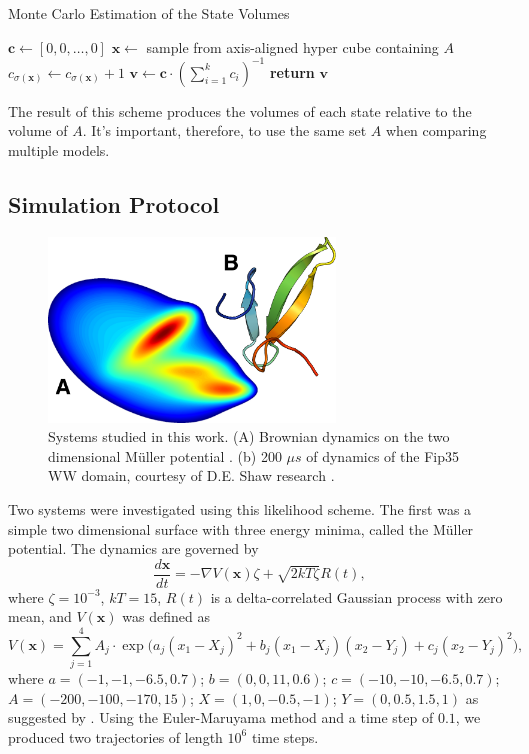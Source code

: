 \documentclass[journal=jpcbfk, layout=traditional, manuscript=article]{achemso}
\begin{document}
\begin{algorithm}
\caption{Monte Carlo Estimation of the State Volumes}
\label{alg:volumes}
\begin{algorithmic}[1]
	\State $\mathbf{c} \gets [0, 0, \ldots, 0]$
		\State $\mathbf{x} \gets $ sample from axis-aligned hyper cube containing $A$
			\State $c_{\sigma(\mathbf{x})} \gets c_{\sigma(\mathbf{x})} + 1$
		\EndIf
	\EndWhile
	\State $\mathbf{v} \gets \mathbf{c} \cdot(\sum_{i=1}^k c_i)^{-1}$ 
	\State \textbf{return} $\mathbf{v}$
\EndProcedure
\end{algorithmic}
\end{algorithm} \noindent The result of this scheme produces the volumes of each state relative to the volume of $A$. It's important, therefore, to use the same set $A$ when comparing multiple models.
\subsection{Simulation Protocol}

\begin{figure}
\centering
\includegraphics[width=3in]{figs_final/mull_ww.png}
\caption{Systems studied in this work. (A) Brownian dynamics on the two dimensional M\"{u}ller potential \cite{Muller1979Location}. (b) 200 $\mu s$ of dynamics of the Fip35 WW domain\cite{Liu2008Experimental}, courtesy of D.E. Shaw research \cite{Shaw2010Atomic}.}
\label{fig:pics}
\end{figure} 

Two systems were investigated using this likelihood scheme. The first was a simple two dimensional surface with three energy minima, called the M\"{u}ller potential. The dynamics are governed by
$$
\frac{d\mathbf{x}}{dt} = - \nabla V(\mathbf{x})\zeta + \sqrt{2kT\zeta} R(t),
$$ where $\zeta = 10^{-3}$, $kT = 15$, $R(t)$ is a delta-correlated Gaussian process with zero mean, and $V(\mathbf{x})$ was defined as
$$
V(\mathbf{x}) =  \sum_{j=1}^4 A_j \cdot \exp\Big(a_j (x_1-X_j)^2+b_j(x_1-X_j)(x_2-Y_j)+c_j(x_2-Y_j)^2\Big),
$$ where $a = (-1, -1, -6.5, 0.7)$; $b = (0, 0, 11, 0.6)$; $c = (-10, -10, -6.5, 0.7)$; $A = (-200, -100, -170, 15)$; $X = (1, 0, -0.5, -1)$; $Y = (0, 0.5, 1.5, 1)$ as suggested by \citet{Muller1979Location}. Using the Euler-Maruyama method and a time step of $0.1$, we produced two trajectories of length $10^6$ time steps.
\end{document}
